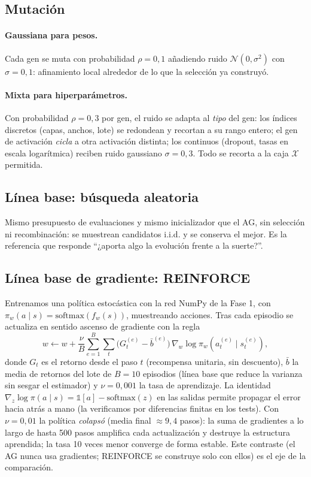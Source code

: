 \subsection{Mutación}

\paragraph{Gaussiana para pesos.}
Cada gen se muta con probabilidad $\rho = 0{,}1$ añadiendo ruido $\mathcal{N}(0, \sigma^2)$ con $\sigma = 0{,}1$: afinamiento local alrededor de lo que la selección ya construyó.

\paragraph{Mixta para hiperparámetros.}
Con probabilidad $\rho = 0{,}3$ por gen, el ruido se adapta al \emph{tipo} del gen: los índices discretos (capas, anchos, lote) se redondean y recortan a su rango entero; el gen de activación \emph{cicla} a otra activación distinta; los continuos (dropout, tasas en escala logarítmica) reciben ruido gaussiano $\sigma = 0{,}3$. Todo se recorta a la caja $\mathcal{X}$ permitida.

\subsection{Línea base: búsqueda aleatoria}

Mismo presupuesto de evaluaciones y mismo inicializador que el AG, sin selección ni recombinación: se muestrean candidatos i.i.d. y se conserva el mejor. Es la referencia que responde ``¿aporta algo la evolución frente a la suerte?''.

\subsection{Línea base de gradiente: REINFORCE}

Entrenamos una política estocástica con la red NumPy de la Fase 1, con $\pi_w(a \mid s) = \text{softmax}(f_w(s))$, muestreando acciones. Tras cada episodio se actualiza en sentido ascenso de gradiente con la regla
\begin{equation}
  w \leftarrow w + \frac{\nu}{B} \sum_{e=1}^{B} \sum_{t} \big( G_t^{(e)} - \bar{b}^{(e)} \big)\, \nabla_w \log \pi_w\!\left( a_t^{(e)} \mid s_t^{(e)} \right),
\end{equation}
donde $G_t$ es el retorno desde el paso $t$ (recompensa unitaria, sin descuento), $\bar{b}$ la media de retornos del lote de $B = 10$ episodios (línea base que reduce la varianza sin sesgar el estimador) y $\nu = 0{,}001$ la tasa de aprendizaje. La identidad $\nabla_z \log \pi(a \mid s) = \mathbb{1}[a] - \text{softmax}(z)$ en las salidas permite propagar el error hacia atrás a mano (la verificamos por diferencias finitas en los tests). Con $\nu = 0{,}01$ la política \emph{colapsó} (media final $\approx 9{,}4$ pasos): la suma de gradientes a lo largo de hasta 500 pasos amplifica cada actualización y destruye la estructura aprendida; la tasa 10 veces menor converge de forma estable. Este contraste (el AG nunca usa gradientes; REINFORCE se construye solo con ellos) es el eje de la comparación.

